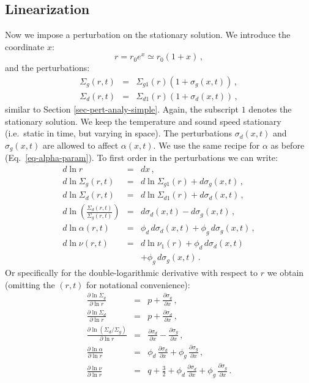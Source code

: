 \documentclass{aa}
\def\comma{\,,}
\def\fullstop{\,.}
\begin{document}
\subsection{Linearization}
\label{sec-linearization}
%
Now we impose a perturbation on the stationary solution. We introduce the
coordinate $x$:
\begin{equation}
r=r_0e^x\simeq r_0(1+x)\comma
\end{equation}
and the perturbations:
\begin{eqnarray}
\Sigma_g(r,t) &=& \Sigma_{g1}(r) (1+\sigma_g(x,t))\comma\label{eq-full-sigma-g-pert}\\
\Sigma_d(r,t) &=& \Sigma_{d1}(r) (1+\sigma_d(x,t))\comma\label{eq-full-sigma-d-pert}
\end{eqnarray}
similar to Section \ref{sec-pert-analy-simple}. Again, the subscript $1$ denotes
the stationary solution.  We keep the temperature and sound speed stationary
(i.e.~static in time, but varying in space). The perturbations $\sigma_d(x,t)$
and $\sigma_g(x,t)$ are allowed to affect $\alpha(x,t)$. We use the same recipe
for $\alpha$ as before (Eq.~\ref{eq-alpha-param}).  To first order in the
perturbations we can write:
\begin{eqnarray}
d\ln r            &=& dx\comma\label{eq-dlnr-dx}\\
d\ln\Sigma_g(r,t) &=& d\ln\Sigma_{g1}(r) + d\sigma_g(x,t) \comma\\
d\ln\Sigma_d(r,t) &=& d\ln\Sigma_{d1}(r) + d\sigma_d(x,t) \comma\\
d\ln\left(\frac{\Sigma_d(r,t)}{\Sigma_g(r,t)}\right) &=&
     d\sigma_d(x,t) - d\sigma_g(x,t)\comma\\
d\ln\alpha(r,t)   &=& \phi_d\,d\sigma_d(x,t)+\phi_g\,d\sigma_g(x,t)\comma\\
d\ln\nu(r,t)    &=& d\ln\nu_{1}(r) + \phi_d\,d\sigma_d(x,t) \nonumber\\
& & + \phi_g\,d\sigma_g(x,t)\fullstop\label{eq-differ-ln-nu}
\end{eqnarray}
Or specifically for the double-logarithmic derivative with respect
to $r$ we obtain (omitting the $(r,t)$ for notational convenience):
\begin{eqnarray}
\frac{\partial\ln\Sigma_g}{\partial\ln r} &=& p + \frac{\partial\sigma_g}{\partial x} \comma\label{eq-dbllog-sigma-g}\\
\frac{\partial\ln\Sigma_d}{\partial\ln r} &=& p + \frac{\partial \sigma_d}{\partial x} \comma\label{eq-dbllog-sigma-d} \\
\frac{\partial\ln(\Sigma_d/\Sigma_g)}{\partial\ln r} &=&
     \frac{\partial\sigma_d}{\partial x} - \frac{\partial\sigma_g}{\partial x}\comma\\
\frac{\partial\ln\alpha}{\partial\ln r} &=& \phi_d\,\frac{\partial\sigma_d}{\partial x}+\phi_g\,\frac{\partial\sigma_g}{\partial x}\comma\\
\frac{\partial\ln\nu}{\partial\ln r} &=& q+\frac{3}{2} + \phi_d\,\frac{\partial\sigma_d}{\partial x}+ \phi_g\,\frac{\partial\sigma_g}{\partial x}\fullstop\label{eq-diff-ln-nu}
\end{eqnarray}
\end{document}
